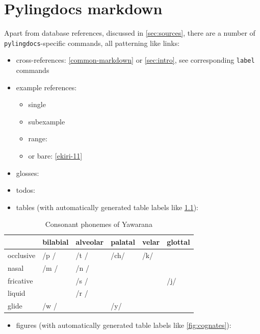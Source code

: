 \documentclass{memoir}
\begin{document}
\chapter{\texorpdfstring{Pylingdocs markdown
\label{pld-md}}{Pylingdocs markdown }}

Apart from database references, discussed in \cref{sec:sources}, there
are a number of \texttt{pylingdocs}-specific commands, all patterning
like links:

\begin{itemize}
\tightlist
\item
  cross-references: \cref{common-markdown} or \cref{sec:intro}, see
  corresponding \texttt{label} commands
\item
  example references:

  \begin{itemize}
  \tightlist
  \item
    single 
  \item
    subexample 
  \item
    range: 
  \item
    or bare: \ref{ekiri-11}
  \end{itemize}
\item
  glosses: 
\item
  todos:
\item
  tables (with automatically generated table labels like
  \cref{tab:consonants}):
\end{itemize}

\begin{table}
\caption{Consonant phonemes of Yawarana}
\label{tab:consonants}
\centering
\begin{tabular}{llllll}
\toprule
 & bilabial & alveolar & palatal & velar & glottal \\
\midrule
occlusive & /p / & /t / & /ch/ & /k/ &  \\
nasal & /m / & /n / &  &  &  \\
fricative &  & /s / &  &  & /j/ \\
liquid &  & /r / &  &  &  \\
glide & /w / &  & /y/ &  &  \\
\bottomrule
\end{tabular}

\end{table}

\begin{itemize}
\tightlist
\item
  figures (with automatically generated table labels like
  \cref{fig:cognates}):
\end{itemize}
\end{document}
